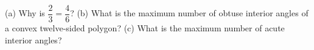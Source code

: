 (a) Why is $\dfrac{2}{3}=\dfrac{4}{6}$? (b) What is the maximum number of obtuse interior angles of a convex twelve-sided polygon? (c) What is the maximum number of acute interior angles?
